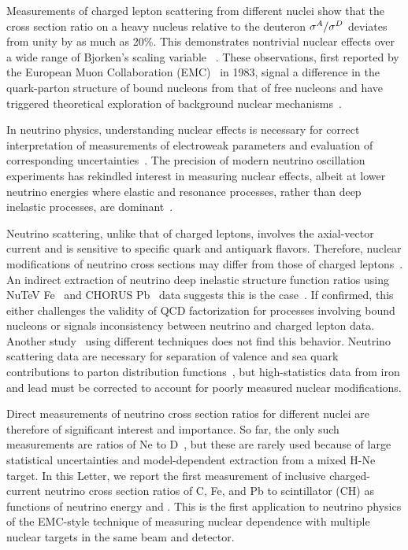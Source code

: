 Measurements of charged lepton scattering
from different nuclei show that the cross section ratio on a heavy nucleus relative to 
the deuteron $\sigma^{A}/\sigma^{D}$ deviates from unity by as much as 20\%. 
This demonstrates nontrivial nuclear effects over a wide range of Bjorken's scaling variable \Xbj~\cite{Arneodo:1992wf,geesaman1995nuclear,Norton:2003cb,rith2014}.
These observations, first reported by the European Muon Collaboration (EMC)~\cite{Aubert:1983xm,Aubert1987740} in 1983, signal a difference in the quark-parton structure of bound nucleons from that of free nucleons
and have triggered theoretical exploration of
background nuclear mechanisms~\cite{Arneodo:1992wf,Norton:2003cb}.

In neutrino physics, understanding nuclear effects is necessary for correct
interpretation of measurements of electroweak parameters 
and evaluation of corresponding uncertainties~\cite{PhysRevLett.88.091802}.
The precision of modern neutrino oscillation experiments
has rekindled interest in measuring nuclear effects, albeit at lower 
neutrino energies where elastic and resonance processes, rather than deep inelastic processes, are dominant~\cite{Coloma:2013tba}.

Neutrino scattering, unlike that of charged leptons, involves the axial-vector current and
is sensitive to specific quark and antiquark flavors.
Therefore, nuclear modifications of neutrino cross sections may differ
from those of charged leptons~\cite{Kulagin2006126,PhysRevC.84.054610,Haider:2013eqa,Kopeliovich:2012kw}.
An indirect extraction of neutrino deep inelastic structure function ratios using NuTeV Fe~\cite{PhysRevD.74.012008} and
CHORUS Pb~\cite{onegut200665} data suggests this is the case~\cite{Kovarik:2010uv}.
If confirmed, this either challenges the validity of QCD factorization for processes
involving bound nucleons or signals inconsistency between neutrino and charged lepton data.
Another study~\cite{PhysRevLett.110.212301} using different techniques does not find this behavior.
Neutrino scattering data are necessary for separation of valence and sea quark contributions to parton distribution functions~\cite{PhysRevC.76.065207,PhysRevD.77.054013,Kovarik:2010uv}, but high-statistics data from iron and lead must be corrected to account for poorly measured nuclear modifications.

Direct measurements of neutrino cross section ratios for different nuclei
are therefore of significant interest and importance.
So far, the only such measurements are ratios of Ne to D~\cite{Parker19841,Cooper1984133,PhysRevD.32.2441}, 
but these are rarely used because of large statistical uncertainties and model-dependent extraction from a mixed H-Ne target.
In this Letter, we report the first measurement of inclusive charged-current neutrino cross section
ratios of C, Fe, and Pb to scintillator (CH) as functions of neutrino energy \Enu and \Xbj.
This is the first application to neutrino physics of the EMC-style technique of measuring nuclear dependence with multiple nuclear targets in the same beam and detector.


